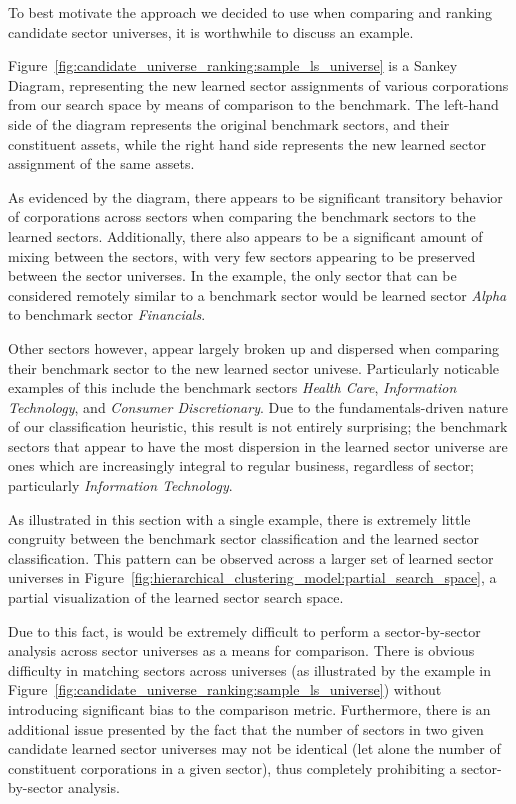 \documentclass[../main.tex]{subfiles}
\begin{document}
To best motivate the approach we decided to use when comparing and ranking candidate sector universes, it is worthwhile to discuss an example.

Figure~\ref{fig:candidate_universe_ranking:sample_ls_universe} is a Sankey Diagram, representing the new learned sector assignments of various corporations from our search space by means of comparison to the benchmark. The left-hand side of the diagram represents the original benchmark sectors, and their constituent assets, while the right hand side represents the new learned sector assignment of the same assets.

As evidenced by the diagram, there appears to be significant transitory behavior of corporations across sectors when comparing the benchmark sectors to the learned sectors. Additionally, there also appears to be a significant amount of mixing between the sectors, with very few sectors appearing to be preserved between the sector universes. In the example, the only sector that can be considered remotely similar to a benchmark sector would be learned sector \textit{Alpha} to benchmark sector \textit{Financials}.

Other sectors however, appear largely broken up and dispersed when comparing their benchmark sector to the new learned sector univese. Particularly noticable examples of this include the benchmark sectors \textit{Health Care}, \textit{Information Technology}, and \textit{Consumer Discretionary}. Due to the fundamentals-driven nature of our classification heuristic, this result is not entirely surprising; the benchmark sectors that appear to have the most dispersion in the learned sector universe are ones which are increasingly integral to regular business, regardless of sector; particularly \textit{Information Technology}.

As illustrated in this section with a single example, there is extremely little congruity between the benchmark sector classification and the learned sector classification. This pattern can be observed across a larger set of learned sector universes in Figure~\ref{fig:hierarchical_clustering_model:partial_search_space}, a partial visualization of the learned sector search space.

Due to this fact, is would be extremely difficult to perform a sector-by-sector analysis across sector universes as a means for comparison. There is obvious difficulty in matching sectors across universes (as illustrated by the example in Figure~\ref{fig:candidate_universe_ranking:sample_ls_universe}) without introducing significant bias to the comparison metric. Furthermore, there is an additional issue presented by the fact that the number of sectors in two given candidate learned sector universes may not be identical (let alone the number of constituent corporations in a given sector), thus completely prohibiting a sector-by-sector analysis.
\end{document}
